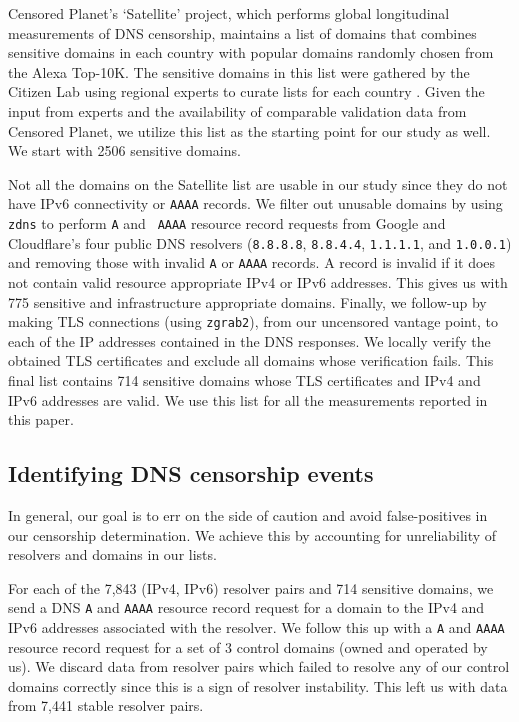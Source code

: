  Censored Planet's `Satellite' project,
which performs global longitudinal measurements of DNS censorship,
\cite{sundara2020censored} maintains a list of domains that combines sensitive
domains in each country with popular domains randomly chosen from the Alexa
Top-10K. The sensitive domains in this list were gathered by the Citizen Lab
using regional experts to curate lists for each country
\cite{citizenlab-blocklists}. Given the input from experts and the availability
of comparable validation data from Censored Planet, we utilize this list as the
starting point for our study as well. We start with 2506 sensitive domains.

 Not all the domains on the Satellite list
are usable in our study since they do not have IPv6 connectivity or {\tt AAAA}
records.
%
We filter out unusable domains by using {\tt zdns} to perform {\tt A} and {\tt
AAAA} resource record requests from Google and Cloudflare's four public DNS
resolvers ({\tt 8.8.8.8}, {\tt 8.8.4.4}, {\tt 1.1.1.1}, and {\tt 1.0.0.1}) and
removing those with invalid {\tt A} or {\tt AAAA} records. A record is invalid
if it does not contain valid resource appropriate IPv4 or IPv6 addresses. This
gives us with 775 sensitive and infrastructure appropriate domains.
%
Finally, we follow-up by making TLS connections (using {\tt zgrab2}), from our
uncensored vantage point, to each of the IP addresses contained in the DNS
responses. We locally verify the obtained TLS certificates and exclude all
domains whose verification fails. 
%
This final list contains 714 sensitive domains whose TLS certificates and IPv4
and IPv6 addresses are valid. We use this list for all the measurements
reported in this paper.

\subsection{Identifying DNS censorship events} \label{sec:methodology:censorship}
In general, our goal is to err on the side of caution and avoid false-positives
in our censorship determination.
We achieve this by accounting for
unreliability of resolvers and domains in our lists.

For each of the 7,843 (IPv4, IPv6) resolver pairs and 714 sensitive domains, we
send a DNS {\tt A} and {\tt AAAA} resource record request for a domain to the
IPv4 and IPv6 addresses associated with the resolver. We follow this up with
a {\tt A} and {\tt AAAA} resource record request for a set of 3 control domains
(owned and operated by us).
%
We discard data from resolver pairs which failed to resolve any of our control
domains correctly since this is a sign of resolver instability. This left us
with data from 7,441 stable resolver pairs.
%

